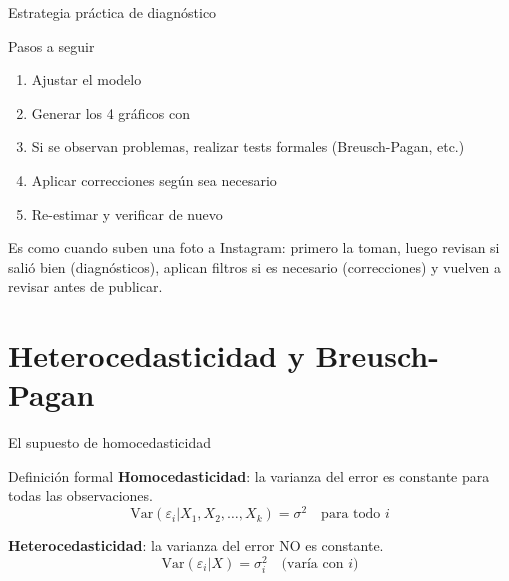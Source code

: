 \documentclass[aspectratio=169, 11pt]{beamer}
\begin{document}
\begin{frame}{Estrategia práctica de diagnóstico}
\begin{exampleblock}{Pasos a seguir}
\begin{enumerate}
\item Ajustar el modelo
\item Generar los 4 gr\'aficos con 
\item Si se observan problemas, realizar tests formales (Breusch-Pagan, etc.)
\item Aplicar correcciones seg\'un sea necesario
\item Re-estimar y verificar de nuevo
\end{enumerate}

\smallskip
\small Es como cuando suben una foto a Instagram: primero la toman, luego revisan si sali\'o bien (diagn\'osticos), aplican filtros si es necesario (correcciones) y vuelven a revisar antes de publicar.
\end{exampleblock}
\end{frame}

\section{Heterocedasticidad y Breusch-Pagan}

\begin{frame}{El supuesto de homocedasticidad}
\begin{block}{Definici\'on formal}
\textbf{Homocedasticidad}: la varianza del error es constante para todas las observaciones.
$$\text{Var}(\varepsilon_i | X_1, X_2, \ldots, X_k) = \sigma^2 \quad \text{para todo } i$$
\end{block}

\textbf{Heterocedasticidad}: la varianza del error NO es constante.
$$\text{Var}(\varepsilon_i | X) = \sigma_i^2 \quad \text{(var\'ia con } i \text{)}$$
\end{frame}
\end{document}
